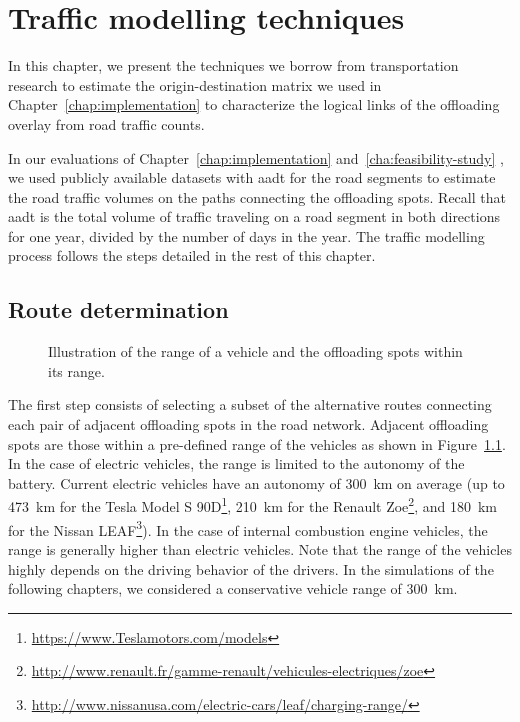 \chapter{Traffic modelling techniques}
\label{cha:traffic-forecasting-techniques}

In this chapter, we present the techniques we borrow from transportation research to estimate the origin-destination matrix we used in Chapter~\ref{chap:implementation} to characterize the logical links of the offloading overlay from road traffic counts. 

In our evaluations of Chapter~\ref{chap:implementation} and~\ref{cha:feasibility-study} , we used publicly available datasets with \acrfull{aadt} for the road segments to estimate the road traffic volumes on the paths connecting the offloading spots. Recall that \acrshort{aadt} is the total volume of traffic traveling on a road segment in both directions for one year, divided by the number of days in the year. The traffic modelling process follows the steps detailed in the rest of this chapter.

\section{Route determination}
\label{sec:route-determination}

\begin{figure}
    
    \caption{Illustration of the range of a vehicle and the offloading spots within its range.}
    \label{fig:vehicle-range}
\end{figure}

The first step consists of selecting a subset of the alternative routes connecting each pair of adjacent offloading spots in the road network. Adjacent offloading spots are those within a pre-defined range of the vehicles as shown in Figure~\ref{fig:vehicle-range}. In the case of electric vehicles, the range is limited to the autonomy of the battery. Current electric vehicles have an autonomy of 300~km on average (\eg up to 473~km for the Tesla Model S 90D\footnote{\url{https://www.Teslamotors.com/models}}, 210~km for the Renault Zoe\footnote{\url{http://www.renault.fr/gamme-renault/vehicules-electriques/zoe}}, and 180~km for the Nissan LEAF\footnote{\url{http://www.nissanusa.com/electric-cars/leaf/charging-range/}}). In the case of internal combustion engine vehicles, the range is generally higher than electric vehicles. Note that the range of the vehicles highly depends on the driving behavior of the drivers. In the simulations of the following chapters, we considered a conservative vehicle range of 300~km.

